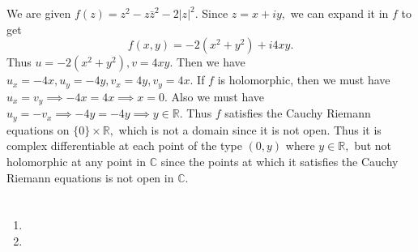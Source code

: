 \documentclass{article}
\title{} %
\author{Gandhar Kulkarni (mmat2304)} %
\date{} %
\begin{document}
\maketitle %


\section{} %
We are given $f(z)=z^2-z\bar{z}^2-2|z|^2.$ Since $z=x+iy,$ we can expand it in $f$ to get 
$$f(x,y)=-2(x^2+y^2)+i4xy.$$ Thus $u=-2(x^2+y^2),v=4xy.$ Then we have $u_x=-4x,u_y=-4y,v_x=4y,v_y=4x.$
If $f$ is holomorphic, then we must have $u_x=v_y \implies -4x=4x \implies x=0.$ Also we must have $u_y=-v_x \implies -4y=-4y \implies y \in \mathbb{R}.$
Thus $f$ satisfies the Cauchy Riemann equations on $\{0\} \times \mathbb{R},$ which is not a domain since it is not open. Thus it is complex differentiable 
at each point of the type $(0,y)$ where $y \in \mathbb{R},$ but not holomorphic at any point in $\mathbb{C}$ since the points at which it satisfies the 
Cauchy Riemann equations is not open in $\mathbb{C}.$ 
\section{} %
\section{} %
\section{} %
\section{} %
\begin{enumerate}
	\item 
	\item 
	
\end{enumerate}
\section{} %
\section{} %
\section{} %
\section{} %
\section{} %
\end{document}
